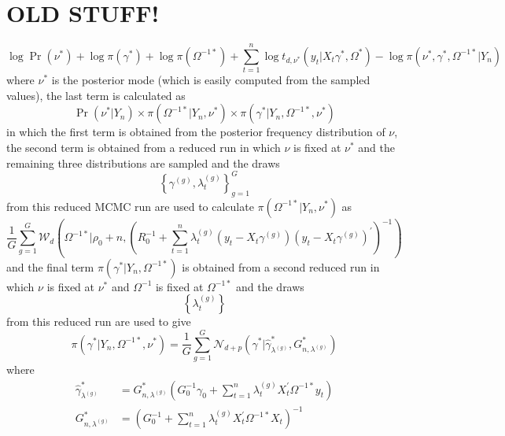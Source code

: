 \documentclass[12pt]{article}
\begin{document}
\section{OLD STUFF!}

\begin{equation*}
\log \Pr \left( \nu ^{\ast }\right) +\log \pi \left( \gamma ^{\ast }\right)
+\log \pi \left( \Omega ^{-1\ast }\right) +\sum_{t=1}^{n}\log t_{d,\nu
^{\ast }}\left( y_{t}|X_{t}\gamma ^{\ast },\Omega ^{\ast }\right) -\log \pi
\left( \nu ^{\ast },\gamma ^{\ast },\Omega ^{-1\ast }|Y_{n}\right)
\end{equation*}%
where $\nu ^{\ast }$ is the posterior mode (which is easily computed from
the sampled values), the last term is calculated as%
\begin{equation*}
\Pr \left( \nu ^{\ast }|Y_{n}\right) \times \pi \left( \Omega ^{-1\ast
}|Y_{n},\nu ^{\ast }\right) \times \pi \left( \gamma ^{\ast }|Y_{n},\Omega
^{-1\ast },\nu ^{\ast }\right)
\end{equation*}%
in which the first term is obtained from the posterior frequency
distribution of $\nu $, the second term is obtained from a reduced run in
which $\nu $ is fixed at $\nu ^{\ast }$ and the remaining three
distributions are sampled and the draws
\begin{equation*}
\left\{ \gamma ^{(g)},\lambda _{t}^{(g)}\right\} _{g=1}^{G}
\end{equation*}%
from this reduced MCMC run are used to calculate $\pi \left( \Omega ^{-1\ast
}|Y_{n},\nu ^{\ast }\right) $ as
\begin{equation*}
\frac{1}{G}\sum_{g=1}^{G}\mathcal{W}_{d}\left( \Omega ^{-1\ast }|\rho
_{0}+n,\left( R_{0}^{-1}+\sum_{t=1}^{n}\lambda _{t}^{(g)}\left(
y_{t}-X_{t}\gamma ^{(g)}\right) \left( y_{t}-X_{t}\gamma ^{(g)}\right)
^{\prime }\right) ^{-1}\right)
\end{equation*}%
and the final term $\pi \left( \gamma ^{\ast }|Y_{n},\Omega ^{-1\ast
}\right) $ is obtained from a second reduced run in which $\nu $ is fixed at
$\nu ^{\ast }$ and $\Omega ^{-1}$ is fixed at $\Omega ^{-1\ast }$ and the
draws
\begin{equation*}
\left\{ \lambda _{t}^{(g)}\right\}
\end{equation*}%
from this reduced run are used to give
\begin{equation*}
\pi (\gamma ^{\ast }|Y_{n},\Omega ^{-1\ast },\nu ^{\ast })=\frac{1}{G}%
\sum_{g=1}^{G}\mathcal{N}_{d+p}\left( \gamma ^{\ast }|\hat{\gamma}_{\lambda
^{(g)}}^{\ast },G_{n,\lambda ^{(g)}}^{\ast }\right)
\end{equation*}%
where%
\begin{align*}
\hat{\gamma}_{\lambda ^{(g)}}^{\ast }& =G_{n,\lambda ^{(g)}}^{\ast }\left(
G_{0}^{-1}\gamma _{0}+\sum_{t=1}^{n}\lambda _{t}^{(g)}X_{t}^{\prime }\Omega
^{-1\ast }y_{t}\right)  \\
G_{n,\lambda ^{(g)}}^{\ast }& =\left( G_{0}^{-1}+\sum_{t=1}^{n}\lambda
_{t}^{(g)}X_{t}^{\prime }\Omega ^{-1\ast }X_{t}\right) ^{-1}
\end{align*}
\end{document}
